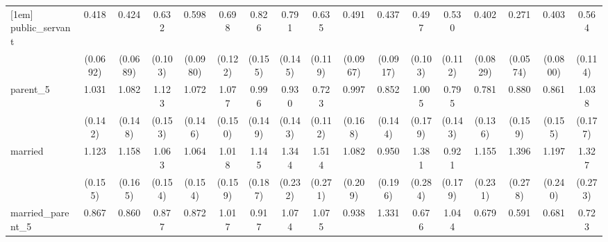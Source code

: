 {\begin{tabular}{l*{16}{c}}
[1em]
public\_servant      &       0.418\sym{***}&       0.424\sym{***}&       0.632\sym{**} &       0.598\sym{**} &       0.698\sym{*}  &       0.826         &       0.791         &       0.635\sym{*}  &       0.491\sym{***}&       0.437\sym{***}&       0.497\sym{***}&       0.530\sym{**} &       0.402\sym{***}&       0.271\sym{***}&       0.403\sym{***}&       0.564\sym{**} \\
                    &    (0.0692)         &    (0.0689)         &     (0.103)         &    (0.0980)         &     (0.122)         &     (0.155)         &     (0.145)         &     (0.119)         &    (0.0967)         &    (0.0917)         &     (0.103)         &     (0.112)         &    (0.0829)         &    (0.0574)         &    (0.0800)         &     (0.114)         \\
[1em]
parent\_5            &       1.031         &       1.082         &       1.123         &       1.072         &       1.077         &       0.996         &       0.930         &       0.723\sym{*}  &       0.997         &       0.852         &       1.005         &       0.795         &       0.781         &       0.880         &       0.861         &       1.038         \\
                    &     (0.142)         &     (0.148)         &     (0.153)         &     (0.146)         &     (0.150)         &     (0.149)         &     (0.143)         &     (0.112)         &     (0.168)         &     (0.144)         &     (0.179)         &     (0.143)         &     (0.136)         &     (0.159)         &     (0.155)         &     (0.177)         \\
[1em]
married             &       1.123         &       1.158         &       1.063         &       1.064         &       1.018         &       1.145         &       1.344         &       1.514\sym{*}  &       1.082         &       0.950         &       1.381         &       0.921         &       1.155         &       1.396         &       1.197         &       1.327         \\
                    &     (0.155)         &     (0.165)         &     (0.154)         &     (0.154)         &     (0.159)         &     (0.187)         &     (0.232)         &     (0.271)         &     (0.209)         &     (0.196)         &     (0.284)         &     (0.179)         &     (0.231)         &     (0.278)         &     (0.240)         &     (0.273)         \\
[1em]
married\_parent\_5    &       0.867         &       0.860         &       0.877         &       0.872         &       1.017         &       0.917         &       1.074         &       1.075         &       0.938         &       1.331         &       0.676         &       1.044         &       0.679         &       0.591         &       0.681         &       0.723         \\

\end{tabular}}
